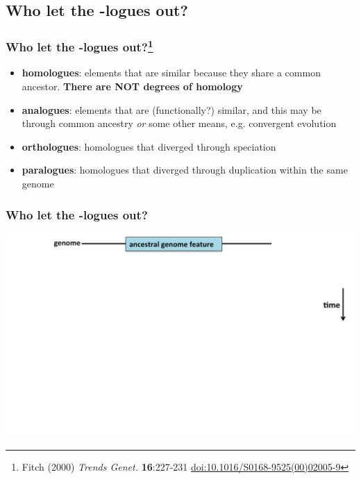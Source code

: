 
\subsection{Who let the -logues out?}

\begin{frame}
  \frametitle{Who let the -logues out?\footnote{\tiny{Fitch (2000) \textit{Trends Genet.} \textbf{16}:227-231 \href{http://dx.doi.org/10.1016/S0168-9525(00)02005-9}{doi:10.1016/S0168-9525(00)02005-9}}}}
    \begin{itemize}
      \item \textbf{homologues}: elements that are similar because they share a common ancestor. \textbf{There are NOT degrees of homology}
      \item \textbf{analogues}: elements that are (functionally?) similar, and this may be through common ancestry \textit{or} some other means, e.g. convergent evolution
      \item \textbf{orthologues}: homologues that diverged through speciation
      \item \textbf{paralogues}: homologues that diverged through duplication within the same genome
    \end{itemize}
\end{frame}

\begin{frame}
  \frametitle{Who let the -logues out?}
  \begin{center}
    \includegraphics[width=1\textwidth]{images/logues1}  
  \end{center}  
\end{frame}

